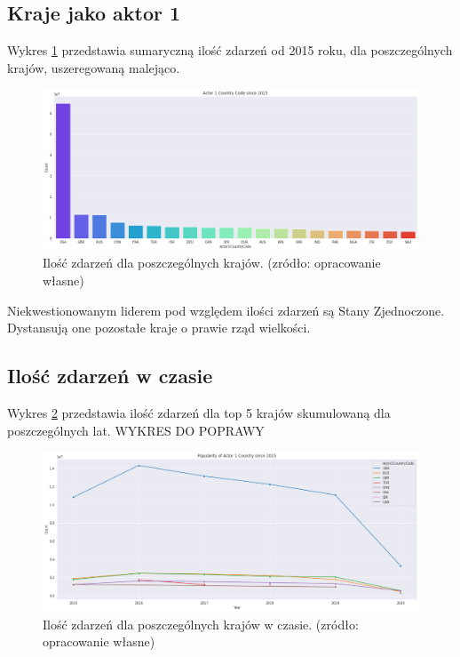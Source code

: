 \documentclass[11pt]{report}
\begin{document}
 \subsection{Kraje jako aktor 1}
 	Wykres \ref{fig:GLOBALactor1} przedstawia sumaryczną ilość zdarzeń od 2015 roku, dla poszczególnych krajów, uszeregowaną malejąco.
      \begin{figure}[ht]
	\centering
	\includegraphics[width=0.8 \textwidth]{fig/GLOBAL/Actor1.png}
	\caption{Ilość zdarzeń dla poszczególnych krajów. (zródło: opracowanie własne)}
	\label{fig:GLOBALactor1}
	\end{figure}
Niekwestionowanym liderem pod względem ilości zdarzeń są Stany Zjednoczone. Dystansują one pozostałe kraje o prawie rząd wielkości.

 \subsection{Ilość zdarzeń w czasie}
 Wykres \ref{fig:GLOBALactor1inTime} przedstawia ilość zdarzeń dla top 5 krajów skumulowaną dla poszczególnych lat.
 WYKRES DO POPRAWY
 	  \begin{figure}[ht]
	\centering
	\includegraphics[width=0.8 \textwidth]{fig/GLOBAL/Actor1inTIME.png}
	\caption{Ilość zdarzeń dla poszczególnych krajów w czasie. (zródło: opracowanie własne)}
	\label{fig:GLOBALactor1inTime}
	\end{figure}
 
\end{document}
